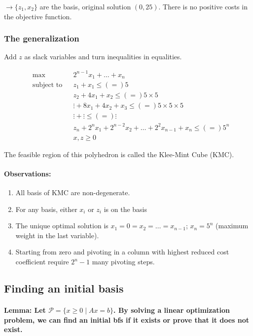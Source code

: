 \documentclass[main]{subfiles}
\begin{document}
$\rightarrow \{z_1, x_2\}$ are the basis, original solution $(0,25)$.
There is no positive costs in the objective function.\\

\subsubsection{The generalization}

Add $z$ as slack variables and turn inequalities in equalities.

\begin{equation*}
\begin{aligned}
& \max
& & 2^{n-1}x_1 + \dots + x_n \\
& \text{subject to}
& & z_1 + x_1 \leq (=) 5 \\
&&& z_2 + 4x_1 + x_2 \leq (=) 5 \times 5\\
&&& \vdots + 8x_1 + 4x_2 + x_3 \leq (=) 5 \times 5 \times 5\\
&&& \vdots + \vdots \leq (=) \vdots\\
&&& z_n + 2^n x_1 + 2^{n-2} x_2 + \dots + 2^2 x_{n-1} + x_n \leq (=) 5^n\\
&&& x, z \geq 0
\end{aligned}
\end{equation*}

The feasible region of this polyhedron is called the Klee-Mint Cube (KMC).

\paragraph{Observations:}
\begin{enumerate}
\item All basis of KMC are non-degenerate.
\item For any basis, either $x_i$ or $z_i$ is on the basis
\item The unique optimal solution is $x_1 = 0 = x_2 = \dots = x_{n-1}$;
$x_n = 5^n$ (maximum weight in the last variable).
\item Starting from zero and pivoting in a column with highest reduced cost
coefficient require $2^n - 1$ many pivoting steps.
\end{enumerate}

\subsection{Finding an initial basis}

\paragraph{Lemma: Let $\mathcal{P} = \{x \geq 0 \mid Ax = b\}$. By solving a
linear optimization problem, we can find an initial bfs if it exists or prove
that it does not exist.}
\end{document}
